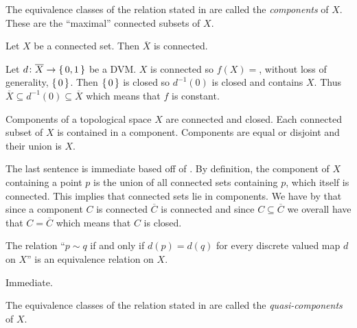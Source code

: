 \documentclass[letterpaper, 11pt]{article}
\begin{document}
\begin{defn}[Components]
  The equivalence classes of the relation stated in  are called the \emph{components} of $X$.
  These are the ``maximal'' connected subsets of $X$.
\end{defn}


\begin{lem}\label{lem: closure_of_connected_is_connected}
  Let $X$ be a connected set.
  Then $\overline{X}$ is connected.
\end{lem}
\begin{pf}
  Let $d\colon \overline{X} \to \set{0, 1}$ be a DVM.\@
  $X$ is connected so $f(X) =$, without loss of generality, $\set{0}$.
  Then $\set{0}$ is closed so $d^{-1}(0)$ is closed and contains $X$.
  Thus $\overline{X} \subseteq d^{-1}(0) \subseteq \overline{X}$ which means that $f$ is constant.
\end{pf}

\begin{prop}
  Components of a topological space $X$ are connected and closed.
  Each connected subset of $X$ is contained in a component.
  Components are equal or disjoint and their union is $X$.
\end{prop}
\begin{pf}
  The last sentence is immediate based off of .
  By definition, the component of $X$ containing a point $p$ is the union of all connected sets containing $p$, which itself is connected.
  This implies that connected sets lie in components.
  We have by  that since a component $C$ is connected $\overline{C}$ is connected and since $C \subseteq \overline{C}$ we overall have that $C = \overline{C}$ which means that $C$ is closed.
\end{pf}

\begin{prop}\label{prop: dvm_eq_rel}
  The relation ``$p \sim q$ if and only if $d(p) = d(q)$ for every discrete valued map $d$ on $X$'' is an equivalence relation on $X$.
\end{prop}
\begin{pf}
  Immediate.
\end{pf}

\begin{defn}
  The equivalence classes of the relation stated in  are called the \emph{quasi-components} of $X$.
\end{defn}
\end{document}
